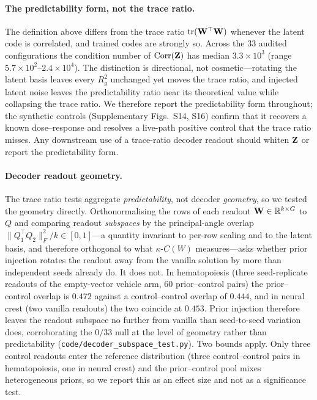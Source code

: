 \documentclass[11pt,a4paper]{article}
\newcommand{\tr}{\trloss}   %
\begin{document}
\paragraph*{The predictability form, not the trace ratio.}
The definition above differs from the trace ratio $\tr(\Wmat^\top\Wmat)$ whenever the latent code is correlated, and trained codes are strongly so. Across the 33 audited configurations the condition number of $\mathrm{Corr}(\mathbf{Z})$ has median $3.3\times10^3$ (range $5.7\times10^2$--$2.4\times10^4$). The distinction is directional, not cosmetic---rotating the latent basis leaves every $R^2_g$ unchanged yet moves the trace ratio, and injected latent noise leaves the predictability ratio near its theoretical value while collapsing the trace ratio. We therefore report the predictability form throughout; the synthetic controls (Supplementary Figs.~S14, S16) confirm that it recovers a known dose--response and resolves a live-path positive control that the trace ratio misses. Any downstream use of a trace-ratio decoder readout should whiten $\mathbf{Z}$ or report the predictability form.

\paragraph*{Decoder readout geometry.}
The trace ratio tests aggregate \emph{predictability}, not decoder \emph{geometry}, so we tested the geometry directly. Orthonormalising the rows of each readout $\mathbf{W}\in\mathbb{R}^{k\times G}$ to $Q$ and comparing readout \emph{subspaces} by the principal-angle overlap $\|Q_1^\top Q_2\|_F^2/k\in[0,1]$---a quantity invariant to per-row scaling and to the latent basis, and therefore orthogonal to what $\kappa$-$C(W)$ measures---asks whether prior injection rotates the readout away from the vanilla solution by more than independent seeds already do. It does not. In hematopoiesis (three seed-replicate readouts of the empty-vector vehicle arm, 60 prior--control pairs) the prior--control overlap is $0.472$ against a control--control overlap of $0.444$, and in neural crest (two vanilla readouts) the two coincide at $0.453$. Prior injection therefore leaves the readout subspace no further from vanilla than seed-to-seed variation does, corroborating the $0/33$ null at the level of geometry rather than predictability (\texttt{code/decoder\_subspace\_test.py}). Two bounds apply. Only three control readouts enter the reference distribution (three control--control pairs in hematopoiesis, one in neural crest) and the prior--control pool mixes heterogeneous priors, so we report this as an effect size and not as a significance test.
\end{document}
